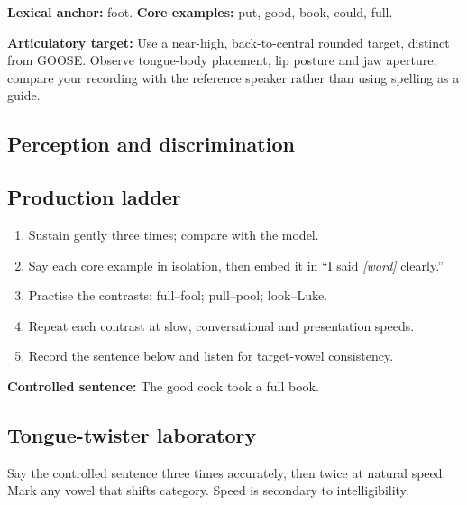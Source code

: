 \textbf{Lexical anchor:} foot. \textbf{Core examples:} put, good, book, could, full.\par
\textbf{Articulatory target:} Use a near-high, back-to-central rounded target, distinct from GOOSE. Observe tongue-body placement, lip posture and jaw aperture; compare your recording with the reference speaker rather than using spelling as a guide.
\subsection{Perception and discrimination}
\subsection{Production ladder}
\begin{enumerate}[label=\arabic*.]
\item Sustain  gently three times; compare with the model.
\item Say each core example in isolation, then embed it in ``I said \emph{[word]} clearly.''
\item Practise the contrasts: full--fool; pull--pool; look--Luke.
\item Repeat each contrast at slow, conversational and presentation speeds.
\item Record the sentence below and listen for target-vowel consistency.
\end{enumerate}
\textbf{Controlled sentence:} The good cook took a full book.
\subsection{Tongue-twister laboratory}
Say the controlled sentence three times accurately, then twice at natural speed. Mark any vowel that shifts category. Speed is secondary to intelligibility.
